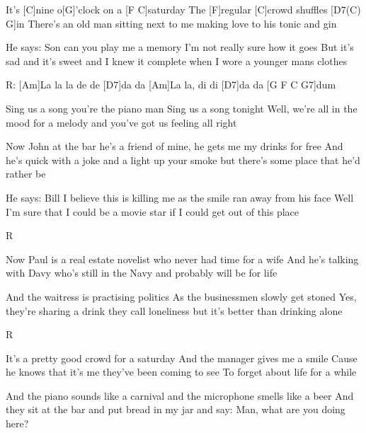 
It's [C]nine o[G]'clock on a [F C]saturday
The [F]regular [C]crowd shuffles [D7(C) G]in
There's an old man sitting next to me
making love to his tonic and gin

He says: Son can you play me a memory
I'm not really sure how it goes
But it's sad and it's sweet and I knew it complete
when I wore a younger mans clothes

R:
[Am]La la la de de [D7]da da 
[Am]La la, di di [D7]da da [G F C G7]dum

Sing us a song you're the piano man
Sing us a song tonight
Well, we're all in the mood for a melody
and you've got us feeling all right

Now John at the bar he's a friend of mine,
he gets me my drinks for free
And he's quick with a joke and a light up your smoke
but there's some place that he'd rather be

He says: Bill I believe this is killing me
as the smile ran away from his face
Well I'm sure that I could be a movie star
if I could get out of this place

R

Now Paul is a real estate novelist
who never had time for a wife
And he's talking with Davy
who's still in the Navy
and probably will be for life

And the waitress is practising politics
As the businessmen slowly get stoned
Yes, they're sharing a drink they call loneliness
but it's better than drinking alone

R

It's a pretty good crowd for a saturday
And the manager gives me a smile
Cause he knows that it's me they've been coming to see
To forget about life for a while

And the piano sounds like a carnival
and the microphone smells like a beer
And they sit at the bar and put bread in my jar
and say: Man, what are you doing here?

